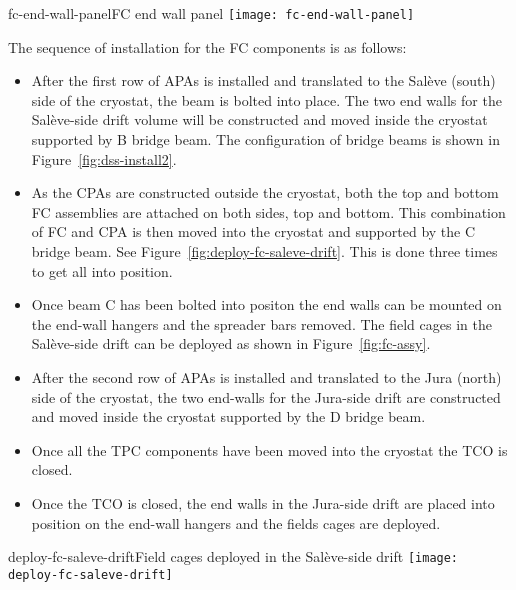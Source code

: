 \begin{cdrfigure}{fc-end-wall-panel}{FC end wall panel }
\texttt{[image: fc-end-wall-panel]}
\end{cdrfigure}

The sequence of installation for the FC components is as follows:
\begin{itemize}
\item After the first row of APAs is installed and translated to the Sal\`{e}ve (south) side of the cryostat, the beam  is bolted into place. The two end walls for the Sal\`{e}ve-side drift volume will be constructed and moved inside the cryostat supported 
by B bridge beam. The configuration of bridge beams is shown in Figure~\ref{fig:dss-install2}.
\item As the CPAs are constructed outside the cryostat, both the top and bottom FC assemblies are attached on both sides, top and bottom.  This combination of FC and CPA is then moved into the cryostat and supported by the C bridge beam. See Figure~\ref{fig:deploy-fc-saleve-drift}.
This is done three times to get all into position.
\item Once beam C  has been bolted into positon the end walls can be mounted on the end-wall hangers and the spreader bars removed.  The field cages in the Sal\`{e}ve-side drift can be deployed as shown in Figure~\ref{fig:fc-assy}.
\item After the second row of APAs is installed and translated to the Jura (north) side of the cryostat, the two end-walls for the Jura-side drift are constructed and moved inside the cryostat supported by the D bridge beam. 
\item Once all the TPC components have been moved into the cryostat the TCO is closed.
\item Once the TCO is closed, the end walls in the Jura-side drift are placed into position on the end-wall hangers and the fields cages are deployed.
\end{itemize}
\begin{cdrfigure}{deploy-fc-saleve-drift}{Field cages deployed in the Sal\`{e}ve-side drift}
\texttt{[image: deploy-fc-saleve-drift]}
\end{cdrfigure}
